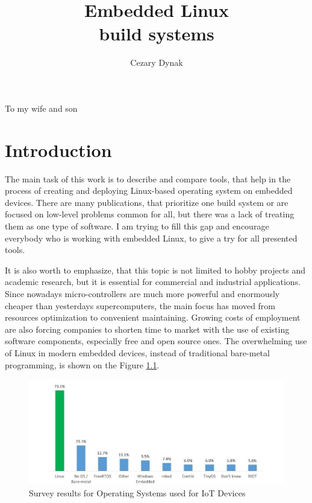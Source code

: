 \documentclass[printmode]{mgr}
\title{Embedded Linux \\ build systems}
\author{Cezary Dynak}
\begin{document}
%


\maketitle
\dedication{6cm}{To my wife and son}

\tableofcontents




















\chapter{Introduction}

The main task of this work is to describe and compare tools, that help in the process of creating and deploying Linux-based operating system on embedded devices.
There are many publications, that prioritize one build system or are focused on low-level problems common for all, but there was a lack of treating them as one type of software.
I am trying to fill this gap and encourage everybody who is working with embedded Linux, to give a try for all presented tools.

It is also worth to emphasize, that this topic is not limited to hobby projects and academic research, but it is essential for commercial and industrial applications.
Since nowadays micro-controllers are much more powerful and enormously cheaper than yesterdays supercomputers, the main focus has moved from resources optimization to convenient maintaining.
Growing costs of employment are also forcing companies to shorten time to market with the use of existing software components, especially free and open source ones.
The overwhelming use of Linux in modern embedded devices, instead of traditional bare-metal programming, is shown on the Figure \ref{fig:iot-os}.

\begin{figure}[htbp]
  \centering
    \includegraphics[width=\textwidth]{iot-os.jpg}
    \caption{Survey results for Operating Systems used for IoT Devices\cite{web:iot-os}}
  \label{fig:iot-os}
\end{figure}
\end{document}
